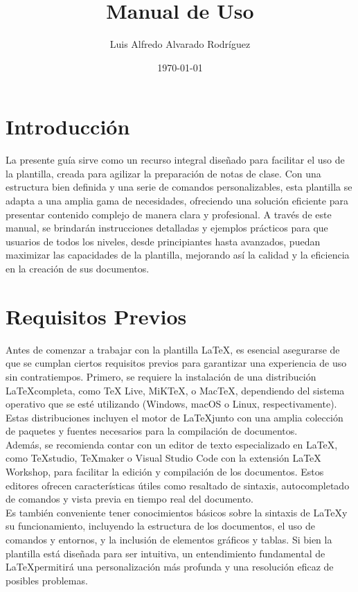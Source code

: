 \documentclass[11pt]{article}
\title{Manual de Uso}
\author{Luis Alfredo Alvarado Rodríguez}
\date{\today}
\begin{document}
\maketitle
\tableofcontents
\newpage

\section{Introducción}
La presente guía sirve como un recurso integral diseñado para facilitar el uso de la plantilla, creada para agilizar la preparación de notas de clase. Con una estructura bien definida y una serie de comandos personalizables, esta plantilla se adapta a una amplia gama de necesidades, ofreciendo una solución eficiente para presentar contenido complejo de manera clara y profesional. A través de este manual, se brindarán instrucciones detalladas y ejemplos prácticos para que usuarios de todos los niveles, desde principiantes hasta avanzados, puedan maximizar las capacidades de la plantilla, mejorando así la calidad y la eficiencia en la creación de sus documentos.

\section{Requisitos Previos}
Antes de comenzar a trabajar con la plantilla \LaTeX, es esencial asegurarse de que se cumplan ciertos requisitos previos para garantizar una experiencia de uso sin contratiempos. Primero, se requiere la instalación de una distribución \LaTeX completa, como TeX Live, MiKTeX, o MacTeX, dependiendo del sistema operativo que se esté utilizando (Windows, macOS o Linux, respectivamente). Estas distribuciones incluyen el motor de \LaTeX junto con una amplia colección de paquetes y fuentes necesarios para la compilación de documentos.\\

Además, se recomienda contar con un editor de texto especializado en \LaTeX, como TeXstudio, TeXmaker o Visual Studio Code con la extensión LaTeX Workshop, para facilitar la edición y compilación de los documentos. Estos editores ofrecen características útiles como resaltado de sintaxis, autocompletado de comandos y vista previa en tiempo real del documento.\\

Es también conveniente tener conocimientos básicos sobre la sintaxis de \LaTeX y su funcionamiento, incluyendo la estructura de los documentos, el uso de comandos y entornos, y la inclusión de elementos gráficos y tablas. Si bien la plantilla está diseñada para ser intuitiva, un entendimiento fundamental de \LaTeX permitirá una personalización más profunda y una resolución eficaz de posibles problemas.\\
\end{document}
